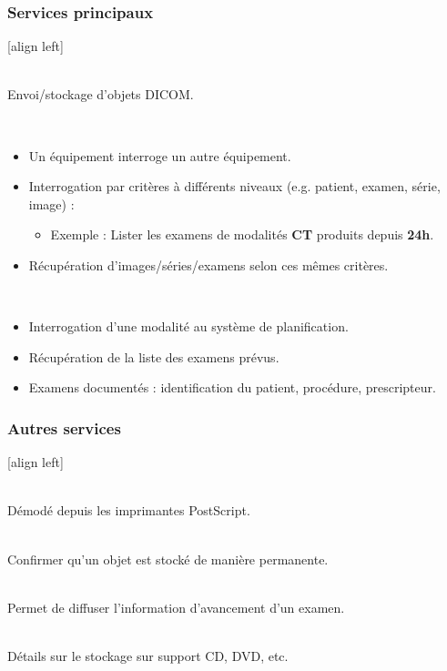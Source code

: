\frame
{
	\frametitle{Services principaux}
	[align left]
	\begin{description}
		\item<2->[Store]~\\
		Envoi/stockage d'objets DICOM.
		\item<3->[Query/Retrieve]~\\
		\begin{itemize}
			\item<4-> Un \'equipement interroge un autre \'equipement.
			\item<5-> Interrogation par crit\`eres \`a diff\'erents niveaux (e.g. patient, examen, s\'erie, image) :
			\begin{itemize}
				\item<6-> Exemple : Lister les examens de modalit\'es \textbf{CT} produits depuis \textbf{24h}.
			\end{itemize}
			\item<7-> R\'ecup\'eration d'images/s\'eries/examens selon ces m\^emes crit\`eres.
		\end{itemize}
		\item<8->[Modality worklist]~\\
		\begin{itemize}
			\item<9-> Interrogation d'une modalit\'e au syst\`eme de planification.
			\item<10-> R\'ecup\'eration de la liste des examens pr\'evus.
			\item<11-> Examens document\'es : identification du patient, proc\'edure, prescripteur.
		\end{itemize}
	\end{description}
}

\frame
{
	\frametitle{Autres services}
	[align left]
	\begin{description}
		\item<1->[Printing]~\\
		D\'emod\'e depuis les imprimantes PostScript.
		\item<2->[Storage commitment]~\\
		Confirmer qu'un objet est stock\'e de mani\`ere permanente.
		\item<3->[Modality performed procedure step]~\\
		Permet de diffuser l'information d'avancement d'un examen.
		\item<4->[Offline media]~\\
		D\'etails sur le stockage sur support CD, DVD, etc.
	\end{description}
}

